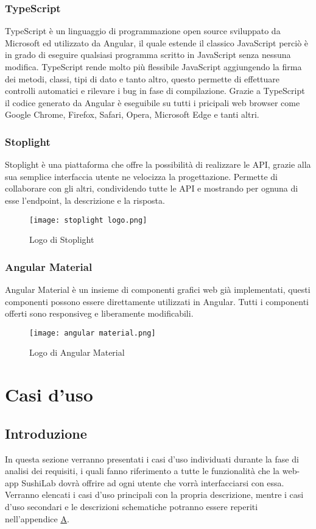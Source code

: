 \subsubsection{TypeScript}
TypeScript è un linguaggio di programmazione open source sviluppato da Microsoft ed utilizzato da Angular, il quale estende il classico JavaScript perciò è in grado di eseguire qualsiasi programma scritto in JavaScript senza nessuna modifica. TypeScript rende molto più flessibile JavaScript aggiungendo la firma dei metodi, classi, tipi di dato e tanto altro, questo permette di effettuare controlli automatici e rilevare i bug in fase di compilazione. Grazie a TypeScript il codice generato da Angular è eseguibile su tutti i pricipali web browser come Google Chrome, Firefox, Safari, Opera, Microsoft Edge e tanti altri.
\subsubsection{Stoplight}
Stoplight è una piattaforma che offre la possibilità di realizzare le API, grazie alla sua semplice interfaccia utente ne velocizza la progettazione. Permette di collaborare con gli altri, condividendo tutte le API e mostrando per ognuna di esse l'endpoint, la descrizione e la risposta.
\begin{figure}[H]
    \centering
    \texttt{[image: stoplight logo.png]}
    \caption{Logo di Stoplight}
\end{figure}
\subsubsection{Angular Material}
Angular Material è un insieme di componenti grafici web già implementati, questi componenti possono essere direttamente utilizzati in Angular. Tutti i componenti offerti sono \gls{responsiveg} e liberamente modificabili.
\begin{figure}[H]
    \centering
    \texttt{[image: angular material.png]}
    \caption{Logo di Angular Material}
\end{figure}
\section{Casi d'uso}
\subsection{Introduzione}
In questa sezione verranno presentati i casi d'uso individuati durante la fase di analisi dei requisiti, i quali fanno riferimento a tutte le funzionalità che la web-app SushiLab dovrà offrire ad ogni utente che vorrà interfacciarsi con essa. Verranno elencati i casi d'uso principali con la propria descrizione, mentre i casi d'uso secondari e le descrizioni schematiche potranno essere reperiti nell'appendice {\hyperref[cap:appendice a]{A}}.
